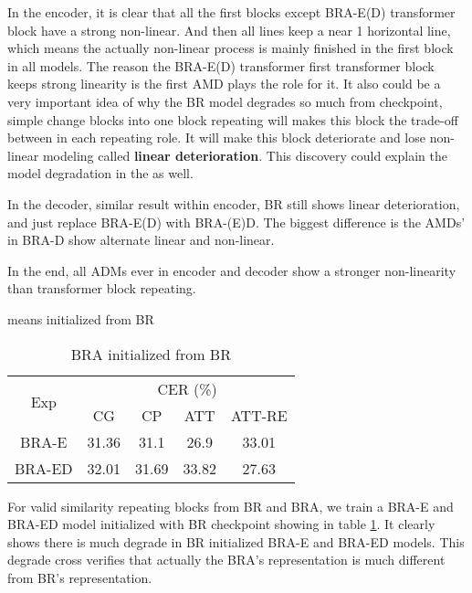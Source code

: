\documentclass{INTERSPEECH2023}
\begin{document}
In the encoder, it is clear that all the first blocks except BRA-E(D) transformer block have a strong non-linear. And then all lines keep a near 1 horizontal line, which means the actually non-linear process is mainly finished in the first block in all models. The reason the BRA-E(D) transformer first transformer block keeps strong linearity is the first AMD plays the role for it. It also could be a very important idea of why the BR model degrades so much from checkpoint, simple change blocks into one block repeating will makes this block the trade-off between in each repeating role. It will make this block deteriorate and lose non-linear modeling called \textbf{linear deterioration}. This discovery could explain the model degradation in the \cite{dehghani2018universal, lan2019albert, gao2021extremely} as well.

In the decoder, similar result within encoder, BR still shows linear deterioration, and just replace BRA-E(D) with BRA-(E)D. The biggest difference is the AMDs' in BRA-D show alternate linear and non-linear.

In the end, all ADMs ever in encoder and decoder show a stronger non-linearity than transformer block repeating.

\begin{table}[t!]
    \centering
    \caption{BRA initialized from BR}
     means initialized from BR \\
    \begin{tabular}{|c|cccc|} \hline
        \multirow{2}{*}{Exp} & \multicolumn{4}{c|}{CER (\%)} \\ \cline{2-5} 
        & \multicolumn{1}{c|}{CG} & \multicolumn{1}{c|}{CP} & \multicolumn{1}{c|}{ATT} & ATT-RE \\ \hline
        BRA-E& \multicolumn{1}{c|}{31.36} & \multicolumn{1}{c|}{31.1}& \multicolumn{1}{c|}{26.9} & 33.01 \\ \hline
        BRA-ED& \multicolumn{1}{c|}{32.01} & \multicolumn{1}{c|}{31.69} & \multicolumn{1}{c|}{33.82} & 27.63 \\ \hline
    \end{tabular}
    \label{table: BRA_finetune_from_BR}
\end{table}

For valid similarity repeating blocks from BR and BRA, we train a BRA-E and BRA-ED model initialized with BR checkpoint showing in table \ref{table: BRA_finetune_from_BR}. It clearly shows there is much degrade in BR initialized BRA-E and BRA-ED models. This degrade cross verifies that actually the BRA's representation is much different from BR's representation.
\end{document}
